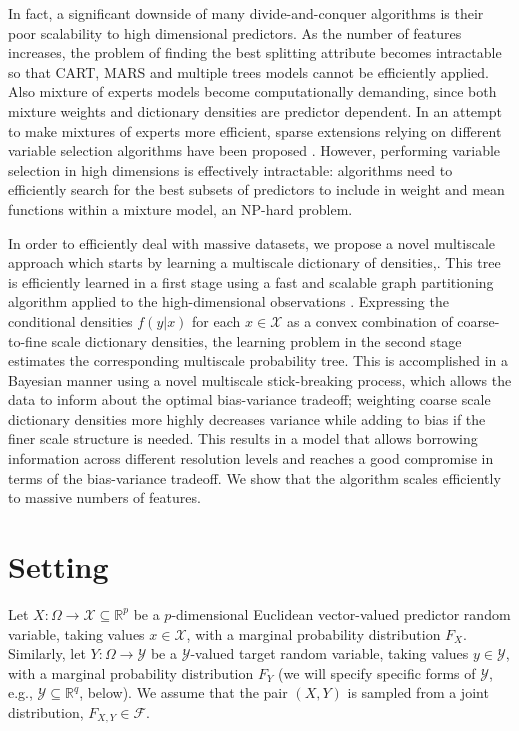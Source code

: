 \documentclass{article} %
\newcommand{\Real}{\mathbb{R}}
\providecommand{\mc}[1]{\mathcal{#1}}
\newcommand{\from}{{\ensuremath{\colon}}}  %
\begin{document}
In fact, a significant downside of many divide-and-conquer algorithms is their poor scalability to high dimensional predictors. As the number of features increases, the problem of finding the best splitting attribute becomes intractable so that CART, MARS and multiple trees models cannot be efficiently applied. Also mixture of experts models become computationally demanding, since both mixture weights and dictionary densities are predictor dependent. In an attempt to make mixtures of experts more efficient, sparse extensions relying on different variable selection algorithms have been proposed \cite{SparseMoF}. However, performing variable selection in high dimensions is effectively intractable: algorithms need to efficiently search for the best subsets of predictors to include in weight and mean functions within a mixture model, an NP-hard problem.

 In order to efficiently deal with massive datasets, we propose a novel multiscale approach which starts by learning a multiscale dictionary of densities,. This tree is efficiently learned in a first stage using a fast and scalable graph partitioning algorithm applied to the high-dimensional observations \cite{metis}.  Expressing the conditional densities $f(y|x)$ for each $x \in \mathcal{X}$ as a convex combination of coarse-to-fine scale dictionary densities, the learning problem in the second stage estimates the corresponding multiscale probability tree.  This is accomplished in a Bayesian manner using a novel multiscale stick-breaking process, which allows the data to inform about the optimal bias-variance tradeoff; weighting coarse scale dictionary densities more highly decreases variance while adding to bias if the finer scale structure is needed.  This results in a model that allows borrowing information across different resolution levels and reaches a good compromise in terms of the bias-variance tradeoff. We show that the algorithm scales efficiently to massive numbers of features. 


\section{Setting} \label{section:setting}
Let $X \from \Omega \to \mc{X} \subseteq \Real^p$ be a 
$p$-dimensional Euclidean vector-valued predictor random variable, taking values $x \in \mc{X}$, with a marginal probability distribution $F_X$.  
Similarly, let $Y \from \Omega \to \mc{Y}$ 
be a $\mc{Y}$-valued target random variable, taking values $y \in \mc{Y}$, with a marginal probability distribution $F_Y$ (we will specify specific forms of $\mc{Y}$, e.g., $\mc{Y} \subseteq \Real^q$, below).  We assume that the pair $(X,Y)$ is sampled from a joint distribution, $F_{X,Y} \in \mc{F}$.
\end{document}
